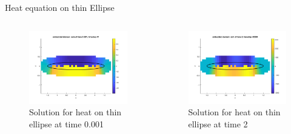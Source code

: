 \documentclass{beamer}
\begin{document}
\begin{frame}{Heat equation on thin Ellipse}
    \pause
    \begin{columns}
        \begin{figure}
            \centering
            \includegraphics[width=1\textwidth]{UBC_IAM_5min_talk/Figures/heat_ellipse/heat_ellipse_CPM_plotdomain_a15b02_init.png}
            \caption{Solution for heat on thin ellipse at time 0.001}
        \end{figure}
        \begin{figure}
            \centering
            \includegraphics[width=1\textwidth]{UBC_IAM_5min_talk/Figures/heat_ellipse/heat_ellipse_CPM_plotdomain_a15b02.png}
            \caption{Solution for heat on thin ellipse at time 2}
        \end{figure}
    \end{columns}
\end{frame}
\end{document}
